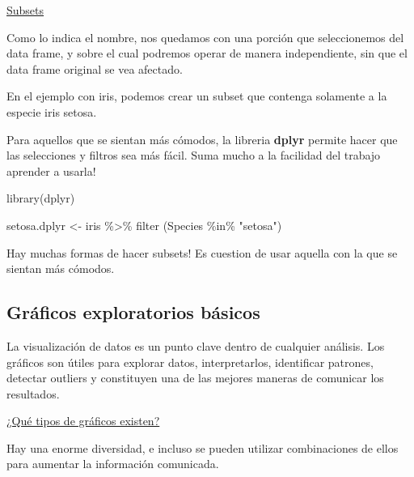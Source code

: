 \documentclass[
]{book}
\newenvironment{Shaded}{\begin{snugshade}}{\end{snugshade}}
\newcommand{\FunctionTok}[1]{\textcolor[rgb]{0.00,0.00,0.00}{#1}}
\newcommand{\NormalTok}[1]{#1}
\newcommand{\OtherTok}[1]{\textcolor[rgb]{0.56,0.35,0.01}{#1}}
\newcommand{\SpecialCharTok}[1]{\textcolor[rgb]{0.00,0.00,0.00}{#1}}
\newcommand{\StringTok}[1]{\textcolor[rgb]{0.31,0.60,0.02}{#1}}
\begin{document}
\uline{Subsets}

Como lo indica el nombre, nos quedamos con una porción que seleccionemos del data frame, y sobre el cual podremos operar de manera independiente, sin que el data frame original se vea afectado.

En el ejemplo con iris, podemos crear un subset que contenga solamente a la especie iris setosa.

\begin{Shaded}
\end{Shaded}

Para aquellos que se sientan más cómodos, la libreria \textbf{dplyr} permite hacer que las selecciones y filtros sea más fácil. Suma mucho a la facilidad del trabajo aprender a usarla!

\begin{Shaded}
\begin{Highlighting}[]
\FunctionTok{library}\NormalTok{(dplyr)}

\NormalTok{setosa.dplyr }\OtherTok{\textless{}{-}}\NormalTok{ iris }\SpecialCharTok{\%\textgreater{}\%} 
  \FunctionTok{filter}\NormalTok{ (Species }\SpecialCharTok{\%in\%} \StringTok{"setosa"}\NormalTok{) }
\end{Highlighting}
\end{Shaded}

Hay muchas formas de hacer subsets! Es cuestion de usar aquella con la que se sientan más cómodos.

\hypertarget{gruxe1ficos-exploratorios-buxe1sicos}{%
\subsection{Gráficos exploratorios básicos}\label{gruxe1ficos-exploratorios-buxe1sicos}}

La visualización de datos es un punto clave dentro de cualquier análisis. Los gráficos son útiles para explorar datos, interpretarlos, identificar patrones, detectar outliers y constituyen una de las mejores maneras de comunicar los resultados.

\uline{¿Qué tipos de gráficos existen?}

Hay una enorme diversidad, e incluso se pueden utilizar combinaciones de ellos para aumentar la información comunicada.
\end{document}
